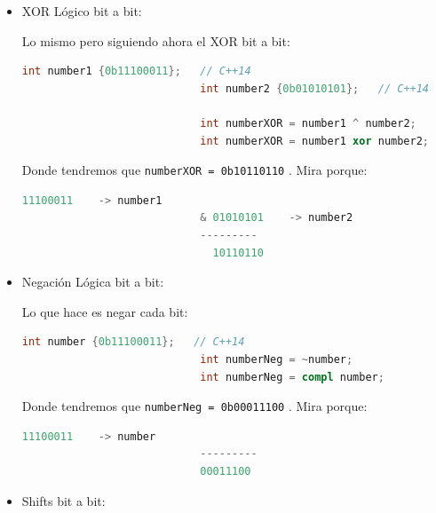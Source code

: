 \documentclass[12pt, fleqn]{report}                             %
\theoremstyle{break}                                            %
\newcommand{\textCode}[1]  { \texttt{#1} }                      %
\begin{document}
\begin{itemize}
                    \item XOR Lógico bit a bit: 
                    
                        Lo mismo pero siguiendo ahora el XOR bit a bit:
                        \begin{lstlisting}[language=C++, gobble=28]
                            int number1 {0b11100011};   // C++14
                            int number2 {0b01010101};   // C++14

                            int numberXOR = number1 ^ number2;
                            int numberXOR = number1 xor number2;
                        \end{lstlisting}

                        Donde tendremos que \textCode{numberXOR = 0b10110110}. Mira porque:
                        \begin{lstlisting}[language=C++, gobble=28]
                              11100011    -> number1
                            & 01010101    -> number2
                            ---------
                              10110110
                        \end{lstlisting}

                    \item Negación Lógica bit a bit: 
                    
                        Lo que hace es negar cada bit:
                        \begin{lstlisting}[language=C++, gobble=28]
                            int number {0b11100011};   // C++14
                            int numberNeg = ~number;
                            int numberNeg = compl number;
                        \end{lstlisting}

                        Donde tendremos que \textCode{numberNeg = 0b00011100}. Mira porque:
                        \begin{lstlisting}[language=C++, gobble=28]
                            11100011    -> number
                            ---------
                            00011100
                        \end{lstlisting}
                    
                    \item Shifts bit a bit:
                    

\end{itemize}
\end{document}
